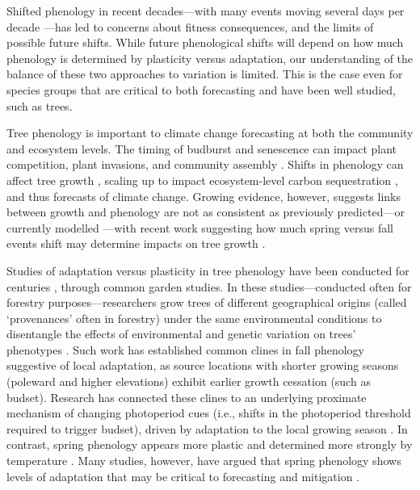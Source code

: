 \documentclass[12pt]{article}
\begin{document}
Shifted phenology in recent decades---with many events moving several days per decade \citep{vita21,khar18,Menzel06}---has led to concerns about fitness consequences, and the limits of possible future shifts. While future phenological shifts will depend on how much phenology is determined by plasticity versus adaptation, our understanding of the balance of these two approaches to variation is limited. This is the case even for species groups that are critical to both forecasting and have been well studied, such as trees. 

Tree phenology is important to climate change forecasting at both the community and ecosystem levels. The timing of budburst and senescence can impact plant competition, plant invasions, and community assembly \citep{fridley12}. Shifts in phenology can affect tree growth \citep{myneni97}, scaling up to impact ecosystem-level carbon sequestration \citep{Barichivich12}, and thus forecasts of climate change. Growing evidence, however, suggests links between growth and phenology are not as consistent as previously predicted---or currently modelled \citep{dow22}---with recent work suggesting how much spring versus fall events shift may determine impacts on tree growth \citep{zohner23}. 

Studies of adaptation versus plasticity in tree phenology have been conducted for centuries \citep{Cleland:2007or}, through common garden studies. In these studies---conducted often for forestry purposes---researchers grow trees of different geographical origins (called `provenances' often in forestry) under the same environmental conditions to disentangle the effects of environmental and genetic variation on trees' phenotypes \citep{AitkenBemmels16, Alberto13}. Such work has established common clines in fall phenology suggestive of local adaptation, as source locations with shorter growing seasons (poleward and higher elevations) exhibit earlier growth cessation (such as budset). Research has connected these clines to an underlying proximate mechanism of changing photoperiod cues (i.e., shifts in the photoperiod threshold required to trigger budset), driven by adaptation to the local growing season \citep{Alberto13,Savolainen07}. In contrast, spring phenology appears more plastic \citep{AitkenBemmels16} and determined more strongly by temperature \citep{flynn18}. Many studies, however, have argued that spring phenology shows levels of adaptation that may be critical to forecasting and mitigation \citep{vitasse2009,Basler:2012}. 
\end{document}
